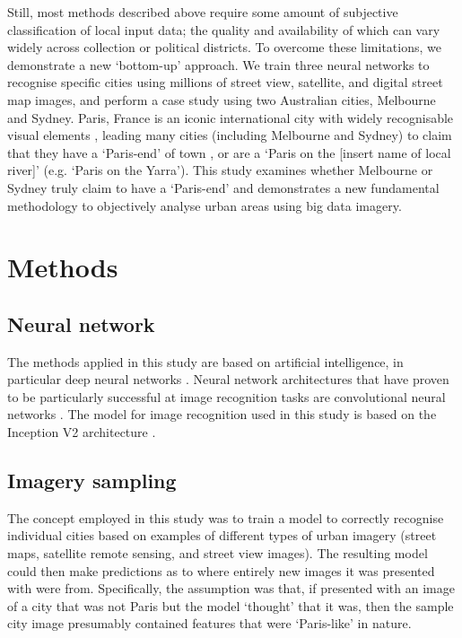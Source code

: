\documentclass[Crown,sageh,times]{sagej}
\begin{document}
Still, most methods described above require some amount of subjective classification of local input data; the quality and availability of which can vary widely across collection or political districts. To overcome these limitations, we demonstrate a new `bottom-up' approach. We train three neural networks to recognise specific cities using millions of street view, satellite, and digital street map images, and perform a case study using two Australian cities, Melbourne and Sydney. Paris, France is an iconic international city \citep{Anholt2006} with widely recognisable visual elements \citep{Doersch2012}, leading many cities (including Melbourne and Sydney) to claim that they have a `Paris-end' of town \citep{Williams2010}, or are a `Paris on the [insert name of local river]' \citep{Wilden2013} (e.g. `Paris on the Yarra'). This study examines whether Melbourne or Sydney truly claim to have a `Paris-end' and demonstrates a new fundamental methodology to objectively analyse urban areas using big data imagery.

\section{Methods}\label{sec:methods}
\subsection{Neural network}\label{sec:methods1}

The methods applied in this study are based on artificial intelligence, in particular deep neural networks \citep{Bishop1995,Samarasinghe2016,Graupe2013}. Neural network architectures that have proven to be particularly successful at image recognition tasks are convolutional neural networks \citep{Schmidhuber2015}. The model for image recognition used in this study is based on the Inception V2 architecture \citep{Szegedy2015,Ioffe2015}. 



\subsection{Imagery sampling}\label{sec:methods2}

The concept employed in this study was to train a model to correctly recognise individual cities based on examples of different types of urban imagery (street maps, satellite remote sensing, and street view images). The resulting model could then make predictions as to where entirely new images it was presented with were from. Specifically, the assumption was that, if presented with an image of a city that was not Paris but the model `thought' that it was, then the sample city image presumably contained features that were `Paris-like' in nature. 
\end{document}
